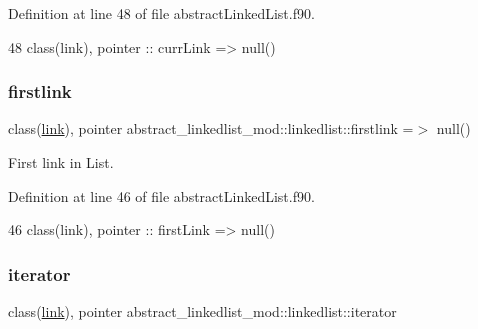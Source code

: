 Definition at line 48 of file abstract\+Linked\+List.\+f90.


\begin{DoxyCode}
48         \textcolor{keywordtype}{class}(link), \textcolor{keywordtype}{pointer} :: currLink => null()
\end{DoxyCode}
\mbox{\label{structabstract__linkedlist__mod_1_1linkedlist_a1db1fbb6e3acfb39a2cab68396f31867}} 
\subsubsection{\texorpdfstring{firstlink}{firstlink}}
{\footnotesize\ttfamily class(\mbox{\hyperlink{structlink__mod_1_1link}{link}}), pointer abstract\+\_\+linkedlist\+\_\+mod\+::linkedlist\+::firstlink =$>$ null()\hspace{0.3cm}{\ttfamily [private]}}



First link in List. 



Definition at line 46 of file abstract\+Linked\+List.\+f90.


\begin{DoxyCode}
46         \textcolor{keywordtype}{class}(link), \textcolor{keywordtype}{pointer} :: firstLink => null()   
\end{DoxyCode}
\mbox{\label{structabstract__linkedlist__mod_1_1linkedlist_a96f2e50678291a2552e6c2cc54bc288d}} 
\subsubsection{\texorpdfstring{iterator}{iterator}}
{\footnotesize\ttfamily class(\mbox{\hyperlink{structlink__mod_1_1link}{link}}), pointer abstract\+\_\+linkedlist\+\_\+mod\+::linkedlist\+::iterator\hspace{0.3cm}{\ttfamily [private]}}



